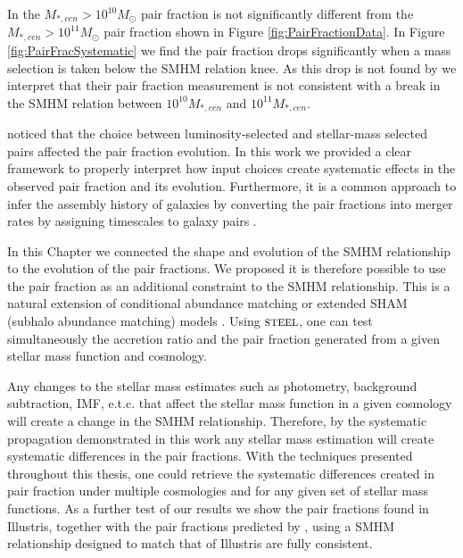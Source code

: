 In \citet{Mundy2017A3.5} the $M_{*,cen} > 10^{10} M_{\odot}$ pair fraction is not significantly different from the $M_{*,cen} > 10^{11} M_{\odot}$ pair fraction shown in Figure \ref{fig:PairFractionData}. In Figure \ref{fig:PairFracSystematic} we find the pair fraction drops significantly when a mass selection is taken below the SMHM relation knee. As this drop is not found by \citet{Mundy2017A3.5} we interpret that their pair fraction measurement is not consistent with a break in the SMHM relation between $10^{10} M_{*,cen}$ and $10^{11} M_{*,cen}$.

\citet{Man2016RESOLVING03} noticed that the choice between luminosity-selected and stellar-mass selected pairs affected the pair fraction evolution. In this work we provided a clear framework to properly interpret how input choices create systematic effects in the observed pair fraction and its evolution. Furthermore, it is a common approach to infer the assembly history of galaxies by converting the pair fractions into merger rates by assigning timescales to galaxy pairs \citep{Conselice20033,Conselice2008TheField,Mundy2017A3.5}. 

In this Chapter we connected the shape and evolution of the SMHM relationship to the evolution of the pair fractions.
We proposed it is therefore possible to use the pair fraction as an additional constraint to the SMHM relationship. This is a natural extension of conditional abundance matching or extended SHAM (subhalo abundance matching) models \citep{Hearin2013SHAMGroups}.
Using $\textsc{steel}$, one can test simultaneously the accretion ratio and the pair fraction generated from a given stellar mass function and cosmology.

Any changes to the stellar mass estimates such as photometry, background subtraction, IMF, e.t.c. that affect the stellar mass function in a given cosmology will create a change in the SMHM relationship. Therefore, by the systematic propagation demonstrated in this work any stellar mass estimation will create systematic differences in the pair fractions. 
With the techniques presented throughout this thesis, one could retrieve the systematic differences created in pair fraction under multiple \LCDM cosmologies and for any given set of stellar mass functions. As a further test of our results we show the pair fractions found in Illustris, together with the pair fractions predicted by \steel, using a SMHM relationship designed to match
that of Illustris are fully consistent.

